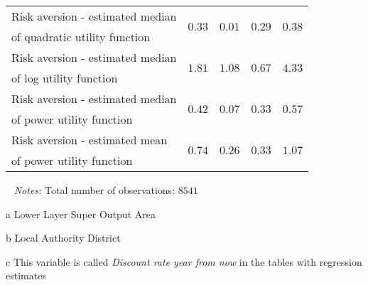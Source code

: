 \documentclass[a4paper,12pt]{article}
\begin{document}
{\begin{threeparttable}
\begin{small}
\begin{tabular}{lrrrr}
 
Risk aversion - estimated median&\multirow{2}{*}{$0.33$}&\multirow{2}{*}{$0.01$}&\multirow{2}{*}{$0.29$}&\multirow{2}{*}{$0.38$}\\
\vspace{0.15cm} \hspace{0.4cm}of quadratic utility function\\ 
 Risk aversion - estimated median&\multirow{2}{*}{$1.81$}&\multirow{2}{*}{$1.08$}&\multirow{2}{*}{$0.67$}&\multirow{2}{*}{$4.33$}\\
\vspace{0.15cm} \hspace{0.4cm}of log utility function\\ 
 Risk aversion - estimated median&\multirow{2}{*}{$0.42$}&\multirow{2}{*}{$0.07$}&\multirow{2}{*}{$0.33$}&\multirow{2}{*}{$0.57$}\\
\vspace{0.15cm} \hspace{0.4cm}of power utility function\\ 
  Risk aversion - estimated mean&\multirow{2}{*}{$0.74$}&\multirow{2}{*}{$0.26$}&\multirow{2}{*}{$0.33$}&\multirow{2}{*}{$1.07$}\\
\vspace{0.15cm} \hspace{0.4cm}of power utility function\\ 
 
\hline
\hline
\end{tabular} 
\end{small}
 \begin{tablenotes}
  \begin{footnotesize}
     \item[~]\textit{Notes:} Total number of observations: $8541$\vspace{-0.35cm}
          \begin{adjustwidth}{0.7cm}{}  

      \item[a] Lower Layer Super Output Area
   \item[b] Local Authority District
  \item[c]This variable is called \textit{Discount rate year from now} in the tables with regression estimates 
    \end{adjustwidth}
\singlespacing
  \end{footnotesize}
\end{tablenotes}
  \end{threeparttable} 
\par}
\end{document}
